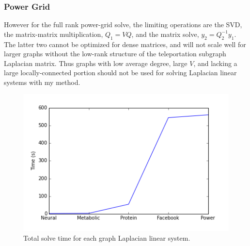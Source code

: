 \documentclass{article}
\begin{document}
\subsubsection{Power Grid}
However for the full rank power-grid solve, the limiting operations are the SVD, the matrix-matrix multiplication, $Q_1 = VQ$, and the matrix solve, $y_2 = Q_2^{-1}y_1$. The latter two cannot be optimized for dense matrices, and will not scale well for larger graphs without the low-rank structure of the teleportation subgraph Laplacian matrix. Thus graphs with low average degree, large $V$, and lacking a large locally-connected portion should not be used for solving Laplacian linear systems with my method.

\begin{figure}
\centering
\includegraphics[width = \linewidth]{total.png}
\caption{Total solve time for each graph Laplacian linear system.}
\end{figure}

%
%
\end{document}

